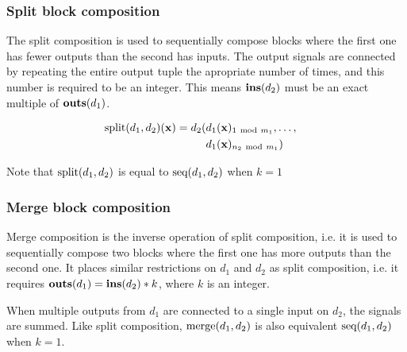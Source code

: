\subsubsection{Split block composition}
The split composition is used to sequentially compose blocks where the first one has fewer outputs than the
second has inputs. The output signals are connected by repeating the entire output tuple the apropriate
number of times, and this number is required to be an integer. This means $\Ins(d_2)$ must be an
exact multiple of $\Outs(d_1)$. \newcommand{\Mod}{\mathrm{\ mod\ }}
\begin{minipage}{0.5\linewidth}
  \begin{prooftree}
  \end{prooftree}
  \begin{align*}
    \Split(d_1, d_2)(\mathbf{x})                ={} &
    \begin{aligned}[t]
      d_2( & d_1(\mathbf{x})_{1 \Mod m_1}, \dots, \\
           & d_1(\mathbf{x})_{n_2\Mod m_1})
    \end{aligned}
  \end{align*}
\end{minipage}
\begin{minipage}{0.5\linewidth}
  \begin{figure}[H]
    \centering
    \label{fig:block_split}
    
  \end{figure}
\end{minipage}

Note that $\Split(d_1, d_2)$ is equal to $\Sequential(d_1, d_2)$ when $k = 1$

\subsubsection{Merge block composition}

Merge composition is the inverse operation of split composition, i.e. it is used to sequentially compose two
blocks where the first one has more outputs than the second one. It places similar restrictions on
$d_1$ and $d_2$ as split composition, i.e. it requires
$\Outs(d_1) = \Ins(d_2) * k$, where $k$ is an integer.

When multiple outputs from $d_1$ are connected to a single input on $d_2$,
the signals are summed. Like split composition, $\Merge(d_1, d_2)$ is also equivalent
$\Sequential(d_1, d_2)$ when $k = 1$.

